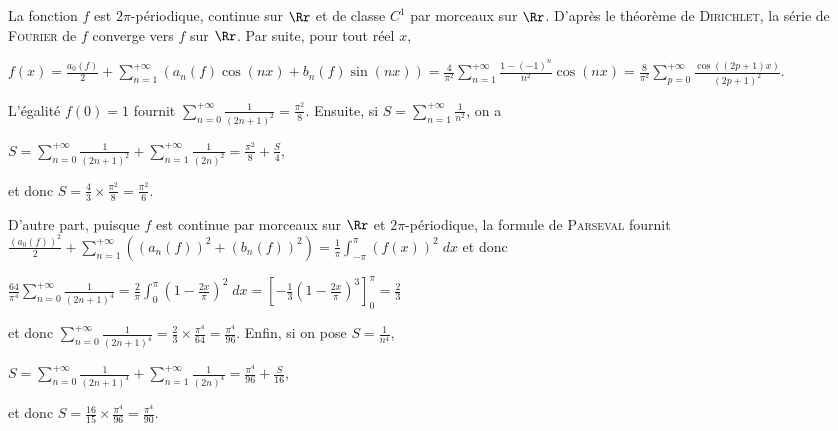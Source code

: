 {{La fonction $f$ est $2\pi$-périodique, continue sur $\Rr$ et de classe $C^1$ par morceaux sur $\Rr$. D'après le théorème de \textsc{Dirichlet}, la série de \textsc{Fourier} de $f$ converge vers $f$ sur $\Rr$. Par suite, pour tout réel $x$, 

\begin{center}
$f(x)=\frac{a_0(f)}{2}+\sum_{n=1}^{+\infty}(a_n(f)\cos(nx)+b_n(f)\sin(nx))=\frac{4}{\pi^2}\sum_{n=1}^{+\infty}\frac{1-(-1)^n}{n^2}\cos(nx)=\frac{8}{\pi^2}\sum_{p=0}^{+\infty}\frac{\cos((2p+1)x)}{(2p+1)^2}$.
\end{center}

\begin{center}
\end{center}

L'égalité $f(0)=1$ fournit $\sum_{n=0}^{+\infty}\frac{1}{(2n+1)^2}=\frac{\pi^2}{8}$. Ensuite, si $S=\sum_{n=1}^{+\infty}\frac{1}{n^2}$, on a

\begin{center}
$S=\sum_{n=0}^{+\infty}\frac{1}{(2n+1)^2}+\sum_{n=1}^{+\infty}\frac{1}{(2n)^2}=\frac{\pi^2}{8}+\frac{S}{4}$,
\end{center}

et donc $S=\frac{4}{3}\times\frac{\pi^2}{8}=\frac{\pi^2}{6}$.

D'autre part, puisque $f$ est continue par morceaux sur $\Rr$ et $2\pi$-périodique, la formule de \textsc{Parseval} fournit $\frac{(a_0(f))^2}{2}+\sum_{n=1}^{+\infty}((a_n(f))^2+(b_n(f))^2)=\frac{1}{\pi}\int_{-\pi}^{\pi}(f(x))^2\;dx$ et donc

\begin{center}
$\frac{64}{\pi^4}\sum_{n=0}^{+\infty}\frac{1}{(2n+1)^4}=\frac{2}{\pi}\int_{0}^{\pi}\left(1-\frac{2x}{\pi}\right)^2\;dx=\left[-\frac{1}{3}\left(1-\frac{2x}{\pi}\right)^3\right]_0^\pi=\frac{2}{3}$
\end{center}

et donc $\sum_{n=0}^{+\infty}\frac{1}{(2n+1)^4}=\frac{2}{3}\times\frac{\pi^4}{64}=\frac{\pi^4}{96}$. Enfin, si on pose $S=\frac{1}{n^4}$,

\begin{center}
$S=\sum_{n=0}^{+\infty}\frac{1}{(2n+1)^4}+\sum_{n=1}^{+\infty}\frac{1}{(2n)^4}=\frac{\pi^4}{96}+\frac{S}{16}$,
\end{center}

et donc $S=\frac{16}{15}\times\frac{\pi^4}{96}=\frac{\pi^4}{90}$.

}}

